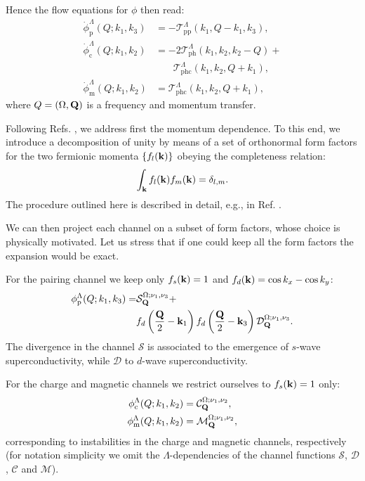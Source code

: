 Hence the flow equations for $\phi$ then read: 
\begin{align}
\dot{\phi}_{\mathrm{p}}^{\Lambda}(Q;k_1,k_3) &= -\mathcal{T}^{\Lambda}_{\mathrm{pp}}(k_1,Q-k_1,k_3) , \\
\nonumber 
\dot{\phi}_{\mathrm{c}}^{\Lambda}(Q;k_1,k_2) &= 
 -2\mathcal{T}^{\Lambda}_{\mathrm{ph}}(k_1,k_2,k_2-Q) +\\
&\phantom{=}
\phantom{2}\mathcal{T}^{\Lambda}_{\mathrm{phc}}(k_1,k_2,Q+k_1) , \\
\dot{\phi}_{\mathrm{m}}^{\Lambda}(Q;k_1,k_2) &= \mathcal{T}^{\Lambda}_{\mathrm{phc}}(k_1,k_2,Q+k_1), 
\end{align}
where $Q=(\Omega,\mathbf{Q})$ is a frequency and momentum transfer. 
 

Following Refs. , we address first the momentum dependence. To this end, we introduce a decomposition of 
unity by means of a set of orthonormal form factors for the two fermionic momenta $\{f_{l}(\mathbf{k})\}$ obeying 
the completeness relation\cite{Lichtenstein2017}:
\begin{equation}
 \int_{\mathbf{k}}  f_{l}(\mathbf{k}) f_{m}(\mathbf{k}) = \delta_{l,m}.
\end{equation}
The procedure outlined here is described in detail, e.g., in Ref. .

We can then project each channel on a subset of form factors, whose choice is physically motivated\cite{Husemann2009}. 
Let us stress that if one could keep all the  form factors the expansion would be exact.

For the pairing channel we keep only $f_{s}(\mathbf{k}) = 1$ and $f_d(\mathbf{k})=\cos{k_x} - \cos{k_y}$:
\begin{align}
\nonumber
  \phi^{\Lambda}_{\mathrm{p}}(Q;k_1,k_3) =&
    \mathcal{S}_{\mathbf{Q}}^{\Omega;\nu_1,\nu_3} +   \\ 
    & f_d\left(\frac{\mathbf{Q}}{2}-\mathbf{k}_1\right) f_d\left(\frac{\mathbf{Q}}{2}-\mathbf{k}_3\right) \mathcal{D}_{\mathbf{Q}}^{\Omega;\nu_1,\nu_3}.
\end{align}
The divergence in the channel $\mathcal{S}$ is associated to the emergence of $s$-wave superconductivity, while $\mathcal{D}$  to $d$-wave superconductivity.\cite{Metzner2012,Platt2013}

For the charge and magnetic channels we restrict ourselves to $f_{s}(\mathbf{k})=1$ only:
\begin{align}
  \phi^\Lambda_{\mathrm{c}}(Q;k_1,k_2) &= \mathcal{C}_{\mathbf{Q}}^{\Omega;\nu_1,\nu_2}, \\
  \phi^\Lambda_{\mathrm{m}}(Q;k_1,k_2) &= \mathcal{M}_{\mathbf{Q}}^{\Omega;\nu_1,\nu_2},
\end{align}
corresponding to instabilities in the charge and magnetic channels, respectively (for notation simplicity we omit 
the $\Lambda$-dependencies of the channel functions $\mathcal{S}$, $\mathcal{D}$, $\mathcal{C}$ and $\mathcal{M}$).

